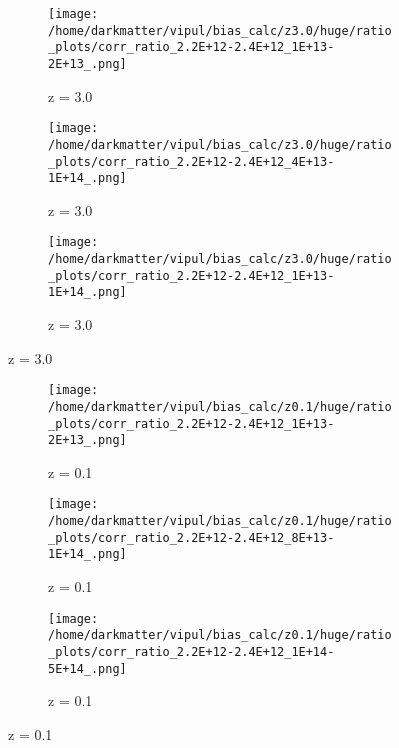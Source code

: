 \documentclass[12pt]{article}
\begin{document}
\begin{figure}[h]
\centering
\begin{subfigure}{.5\textwidth}
    \centering
    \texttt{[image: /home/darkmatter/vipul/bias\_calc/z3.0/huge/ratio\_plots/corr\_ratio\_2.2E+12-2.4E+12\_1E+13-2E+13\_.png]}
    \caption{z = 3.0}
\end{subfigure}%
\begin{subfigure}{.5\textwidth}
    \centering
    \texttt{[image: /home/darkmatter/vipul/bias\_calc/z3.0/huge/ratio\_plots/corr\_ratio\_2.2E+12-2.4E+12\_4E+13-1E+14\_.png]}
    \caption{z = 3.0}
\end{subfigure}

\begin{subfigure}{.5\textwidth}
    \centering
    \texttt{[image: /home/darkmatter/vipul/bias\_calc/z3.0/huge/ratio\_plots/corr\_ratio\_2.2E+12-2.4E+12\_1E+13-1E+14\_.png]}
    \caption{z = 3.0}
\end{subfigure}

\end{figure}

\begin{figure}[b]
\begin{subfigure}{.5\textwidth}
    \centering
    \texttt{[image: /home/darkmatter/vipul/bias\_calc/z0.1/huge/ratio\_plots/corr\_ratio\_2.2E+12-2.4E+12\_1E+13-2E+13\_.png]}
        \caption{z = 0.1}
\end{subfigure}%
\begin{subfigure}{.5\textwidth}
    \centering
    \texttt{[image: /home/darkmatter/vipul/bias\_calc/z0.1/huge/ratio\_plots/corr\_ratio\_2.2E+12-2.4E+12\_8E+13-1E+14\_.png]}
    \caption{z = 0.1}
\end{subfigure}

\begin{subfigure}{.5\textwidth}
    \centering
    \texttt{[image: /home/darkmatter/vipul/bias\_calc/z0.1/huge/ratio\_plots/corr\_ratio\_2.2E+12-2.4E+12\_1E+14-5E+14\_.png]}
    \caption{z = 0.1}
\end{subfigure}
\end{figure}
\end{document}
